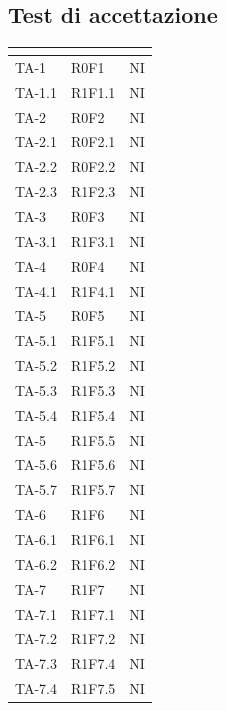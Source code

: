 \subsection{Test di accettazione}
\normalsize
\renewcommand{\arraystretch}{1}
\begin{longtable}{|C{2.5cm}|C{2.5cm}|C{2.5cm}|}
	\hline
	\textbf{\color{title_text}{Test}} & \textbf{\color{title_text}{Requisito}} & \textbf{\color{title_text}{Stato}} \\
	\hline
	\endhead
	{TA-1} & {R0F1} & {NI}\\
	\hline
	{TA-1.1} & {R1F1.1} 
	& {NI}\\
	\hline
	{TA-2} & {R0F2} 
	& {NI}\\
	\hline
	{TA-2.1} & {R0F2.1}
	& {NI}\\
	\hline
	{TA-2.2} & {R0F2.2}
	& {NI}\\
	\hline
	{TA-2.3} & {R1F2.3} 
	& {NI}\\
	\hline
	{TA-3} & {R0F3} 
	& {NI}\\
	\hline
	{TA-3.1} & {R1F3.1}
	& {NI}\\
	\hline
	{TA-4} & {R0F4}
	& {NI}\\
	\hline
	{TA-4.1} & {R1F4.1}
	& {NI}\\
	\hline
	{TA-5} & {R0F5}
	& {NI}\\
	\hline
	{TA-5.1} & {R1F5.1}
	& {NI}\\
	\hline
	{TA-5.2} & {R1F5.2}
	& {NI}\\
	\hline
	{TA-5.3} & {R1F5.3}
	& {NI}\\
	\hline
	{TA-5.4} & {R1F5.4}
	& {NI}\\
	\hline
	{TA-5} & {R1F5.5}
	& {NI}\\
	\hline
	{TA-5.6} & {R1F5.6}
	& {NI}\\
	\hline
	{TA-5.7} & {R1F5.7}
	& {NI}\\
	\hline
	{TA-6} & {R1F6}
	& {NI}\\
	\hline
	{TA-6.1} & {R1F6.1}
	& {NI}\\
	\hline
	{TA-6.2} & {R1F6.2}
	& {NI}\\
	\hline
	{TA-7} & {R1F7}
	& {NI}\\
	\hline
	{TA-7.1} & {R1F7.1}
	& {NI}\\
	\hline
	{TA-7.2} & {R1F7.2}
	& {NI}\\
	\hline
	{TA-7.3} & {R1F7.4}
	& {NI}\\
	\hline
	{TA-7.4} & {R1F7.5}
	& {NI}\\

\end{longtable}
